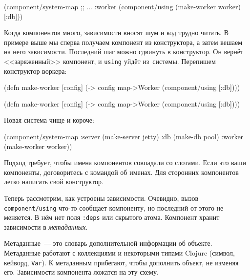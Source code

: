 \begin{english}
  \begin{clojure}
(component/system-map
 ;; ...
 :worker (component/using
          (make-worker worker) [:db]))
  \end{clojure}
\end{english}

Когда компонентов много, зависимости вносят шум и код трудно читать. В примере
выше мы сперва получаем компонент из конструктора, а затем вешаем на него
зависимости. Последний шаг можно сдвинуть в конструктор. Он вернёт
<<заряженный>> компонент, и \verb|using| уйдёт из~системы. Перепишем конструктор
воркера:

\ifx\DEVICETYPE\MOBILE

\begin{english}
  \begin{clojure}
(defn make-worker [config]
  (-> config
      map->Worker
      (component/using [:db])))
  \end{clojure}
\end{english}

\else

\begin{english}
  \begin{clojure}
(defn make-worker [config]
  (-> config map->Worker (component/using [:db])))
  \end{clojure}
\end{english}

\fi

\noindent
Новая система чище и короче:

\begin{english}
  \begin{clojure}
(component/system-map
 :server (make-server jetty)
 :db     (make-db pool)
 :worker (make-worker worker))
  \end{clojure}
\end{english}

Подход требует, чтобы имена компонентов совпадали со слотами. Если это ваши
компоненты, договоритесь с командой об именах. Для сторонних компонентов легко
написать свой конструктор.


Теперь рассмотрим, как устроены зависимости. Очевидно, вызов
\verb|component/using| что-то сообщает компоненту, но последний от этого не
меняется. В нём нет поля \verb|:deps| или скрытого атома. Компонент хранит
зависимости в \emph{метаданных}.

Метаданные~--- это словарь дополнительной информации об объекте. Метаданные работают
с коллекциями и некоторыми типами Clojure (символ, кейворд, \verb|Var|). К
метаданным прибегают, чтобы дополнить объект, не изменяя его. Зависимости
компонента ложатся на эту схему.

